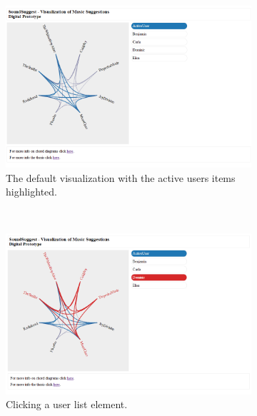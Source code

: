 \begin{figure}
	\centering
	\begin{subfigure}[b]{0.3\textwidth}
					\centering
					\includegraphics[width=\textwidth]{img/prototype_soundsuggest1_default}
					\caption{The default visualization with the active users items highlighted.}
					\label{figure:prototype_soundsuggest1_default}
	\end{subfigure}%
	~
	\begin{subfigure}[b]{0.3\textwidth}
					\centering
					\includegraphics[width=\textwidth]{img/prototype_soundsuggest1_user_click}
					\caption{Clicking a user list element.}
					\label{figure:prototype_soundsuggest1_user_click}
	\end{subfigure}
	~
	\begin{subfigure}[b]{0.3\textwidth}
					\centering

\end{subfigure}
\end{figure}
